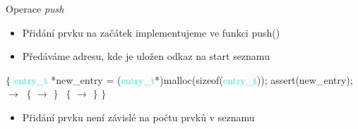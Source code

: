 \documentclass[10pt, hyperref={unicode}]{beamer}
\begin{document}
\begin{frame}{Operace \textit{push}}
    \begin{itemize}
        \item Přidání prvku na začátek implementujeme ve funkci \alert{push()}
        \item Předáváme adresu, kde je uložen odkaz na start seznamu
    \end{itemize}
\hspace*{10mm} \newline
\hspace*{10mm} \newline
    
 \newline
\hspace*{1mm} $\{$ \newline
\hspace*{4mm} \textcolor{cyan}{entry\_t} *new\_entry = (\textcolor{cyan}{entry\_t}*)malloc(\textcolor{darkpurple }{sizeof}(\textcolor{cyan}{entry\_t})); \newline
\hspace*{4mm} assert(new\_entry); \newline
\hspace*{4mm}  $\rightarrow$  \newline
\hspace*{5mm}  $\ \{$ \newline
\hspace*{8mm}  $\rightarrow$  \newline
\hspace*{4mm} $\} \ $  $\ \{ $\newline
\hspace*{8mm}  $\rightarrow$  \newline
\hspace*{4mm} $\}$ \newline
\hspace*{4mm}  \newline
\hspace*{2mm} $\}$ 
    
    \begin{itemize}
        \item Přidání prvku není závislé na počtu prvků v seznamu
    \end{itemize}
\end{frame}
\end{document}
